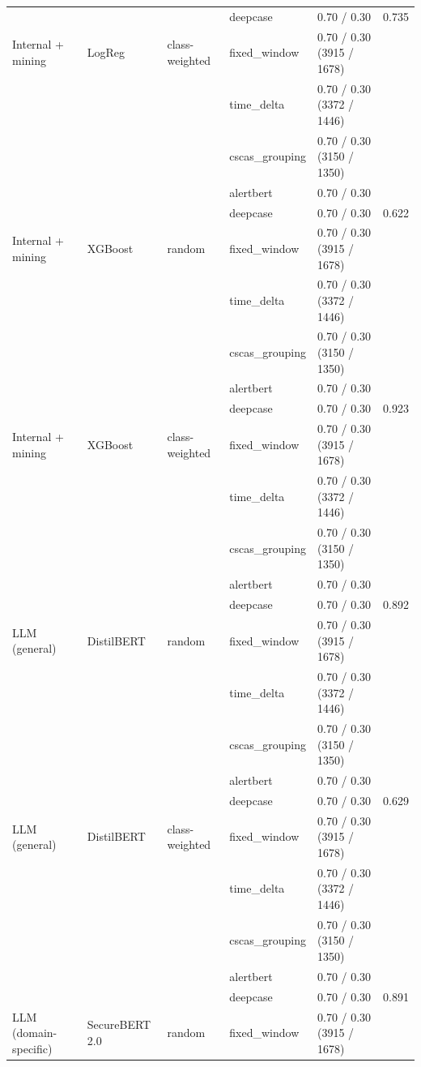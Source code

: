 \begin{table}[htbp]
{\begin{tabular}{lllllc}
 &  &  & deepcase & 0.70 / 0.30 & 0.735 \\
\addlinespace
Internal + mining & LogReg & class-weighted & fixed\_window & 0.70 / 0.30 (3915 / 1678) &  \\
 &  &  & time\_delta & 0.70 / 0.30 (3372 / 1446) &  \\
 &  &  & cscas\_grouping & 0.70 / 0.30 (3150 / 1350) &  \\
 &  &  & alertbert & 0.70 / 0.30 &  \\
 &  &  & deepcase & 0.70 / 0.30 & 0.622 \\
\addlinespace
Internal + mining & XGBoost & random & fixed\_window & 0.70 / 0.30 (3915 / 1678) &  \\
 &  &  & time\_delta & 0.70 / 0.30 (3372 / 1446) &  \\
 &  &  & cscas\_grouping & 0.70 / 0.30 (3150 / 1350) &  \\
 &  &  & alertbert & 0.70 / 0.30 &  \\
 &  &  & deepcase & 0.70 / 0.30 & 0.923 \\
\addlinespace
Internal + mining & XGBoost & class-weighted & fixed\_window & 0.70 / 0.30 (3915 / 1678) &  \\
 &  &  & time\_delta & 0.70 / 0.30 (3372 / 1446) &  \\
 &  &  & cscas\_grouping & 0.70 / 0.30 (3150 / 1350) &  \\
 &  &  & alertbert & 0.70 / 0.30 &  \\
 &  &  & deepcase & 0.70 / 0.30 & 0.892 \\
\midrule
LLM (general) & DistilBERT & random & fixed\_window & 0.70 / 0.30 (3915 / 1678) &  \\
 &  &  & time\_delta & 0.70 / 0.30 (3372 / 1446) &  \\
 &  &  & cscas\_grouping & 0.70 / 0.30 (3150 / 1350) &  \\
 &  &  & alertbert & 0.70 / 0.30 &  \\
 &  &  & deepcase & 0.70 / 0.30 & 0.629 \\
\addlinespace
LLM (general) & DistilBERT & class-weighted & fixed\_window & 0.70 / 0.30 (3915 / 1678) &  \\
 &  &  & time\_delta & 0.70 / 0.30 (3372 / 1446) &  \\
 &  &  & cscas\_grouping & 0.70 / 0.30 (3150 / 1350) &  \\
 &  &  & alertbert & 0.70 / 0.30 &  \\
 &  &  & deepcase & 0.70 / 0.30 & 0.891 \\
\addlinespace
LLM (domain-specific) & SecureBERT 2.0 & random & fixed\_window & 0.70 / 0.30 (3915 / 1678) &  \\

\end{tabular}}
\end{table}
